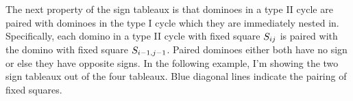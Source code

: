 \documentclass[12pt]{article}
\numberwithin{equation}{section}
\theoremstyle{definition}
\theoremstyle{remark}
\begin{document}
  The next property of the sign tableaux is that dominoes in a type II cycle are paired with dominoes in the type I cycle which they are immediately nested in.
  Specifically, each domino in a type II cycle with fixed square $\sij$ is paired with the domino with fixed square $\ss{i-1}{j-1}$.
  Paired dominoes either both have no sign or else they have opposite signs.
  In the following example, I'm showing the two sign tableaux out of the four tableaux.
  Blue diagonal lines indicate the pairing of fixed squares.

  \begin{figure}[H]
    \centering
  \end{figure}
\end{document}
